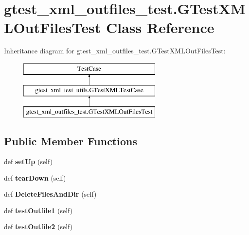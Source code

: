 \hypertarget{classgtest__xml__outfiles__test_1_1GTestXMLOutFilesTest}{}\section{gtest\+\_\+xml\+\_\+outfiles\+\_\+test.\+G\+Test\+X\+M\+L\+Out\+Files\+Test Class Reference}
\label{classgtest__xml__outfiles__test_1_1GTestXMLOutFilesTest}
Inheritance diagram for gtest\+\_\+xml\+\_\+outfiles\+\_\+test.\+G\+Test\+X\+M\+L\+Out\+Files\+Test\+:\begin{figure}[H]
\begin{center}
\leavevmode
\includegraphics[height=3.000000cm]{classgtest__xml__outfiles__test_1_1GTestXMLOutFilesTest}
\end{center}
\end{figure}
\subsection*{Public Member Functions}
\begin{DoxyCompactItemize}
\item 
\mbox{\label{classgtest__xml__outfiles__test_1_1GTestXMLOutFilesTest_a56550f293277d18c36e868a637fe1153}} 
def {\bfseries set\+Up} (self)
\item 
\mbox{\label{classgtest__xml__outfiles__test_1_1GTestXMLOutFilesTest_a49d1d410370ba8a3cfcc281eaadb5706}} 
def {\bfseries tear\+Down} (self)
\item 
\mbox{\label{classgtest__xml__outfiles__test_1_1GTestXMLOutFilesTest_a503d2fbc9cd782ae57ac4307d2db43e1}} 
def {\bfseries Delete\+Files\+And\+Dir} (self)
\item 
\mbox{\label{classgtest__xml__outfiles__test_1_1GTestXMLOutFilesTest_a034738bbc00ac46d00f183402c561228}} 
def {\bfseries test\+Outfile1} (self)
\item 
\mbox{\label{classgtest__xml__outfiles__test_1_1GTestXMLOutFilesTest_a3c02687f092a482d0d0260c7ed94c618}} 
def {\bfseries test\+Outfile2} (self)
\end{DoxyCompactItemize}
